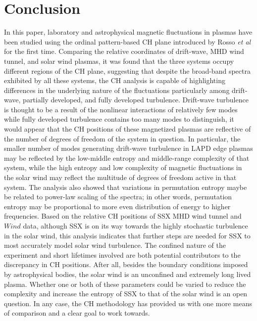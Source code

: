 \documentclass[aps,pre,twocolumn,secnumarabic,nobalancelastpage,amsmath,amssymb,
nofootinbib]{revtex4-1}
\begin{document}
\section{Conclusion}
In this paper, laboratory and astrophysical magnetic fluctuations in plasmas have been studied using the ordinal pattern-based CH plane introduced by Rosso \textit{et al} for the first time. Comparing the relative coordinates of drift-wave, MHD wind tunnel, and solar wind plasmas, it was found that the three systems occupy different regions of the CH plane, suggesting that despite the broad-band spectra exhibited by all these systems, the CH analysis is capable of highlighting differences in the underlying nature of the fluctuations particularly among drift-wave, partially developed, and fully developed turbulence. Drift-wave turbulence is thought to be a result of the nonlinear interactions of relatively few modes while fully developed turbulence contains too many modes to distinguish, it would appear that the CH positions of these magnetized plasmas are reflective of the number of degrees of freedom of the system in question. In particular, the smaller number of modes generating drift-wave turbulence in LAPD edge plasmas may be reflected by the low-middle entropy and middle-range complexity of that system, while the high entropy and low complexity of magnetic fluctuations in the solar wind may reflect the multitude of degrees of freedom active in that system. The analysis also showed that variations in permutation entropy maybe be related to power-law scaling of the spectra; in other words, permutation entropy may be proportional to more even distribution of energy to higher frequencies. Based on the relative CH positions of SSX MHD wind tunnel and $\textit{Wind}$ data, although SSX is on its way towards the highly stochastic turbulence in the solar wind, this analysis indicates that further steps are needed for SSX  to most accurately model solar wind turbulence. The confined nature of the experiment and short lifetimes involved are both potential contributors to the discrepancy in CH positions. After all, besides the boundary conditions imposed by astrophysical bodies, the solar wind is an unconfined and extremely long lived plasma. Whether one or both of these parameters could be varied to reduce the complexity and increase the entropy of SSX to that of the solar wind is an open question. In any case, the CH methodology has provided us with one more means of comparison and a clear goal to work towards.





\nocite{*}
\end{document}
